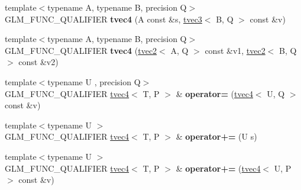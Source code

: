 \begin{DoxyCompactItemize}
\item 
{\footnotesize template$<$typename A, typename B, precision Q$>$ }\\G\+L\+M\+\_\+\+F\+U\+N\+C\+\_\+\+Q\+U\+A\+L\+I\+F\+I\+ER {\bfseries tvec4} (A const \&s, \hyperlink{structglm_1_1detail_1_1tvec3}{tvec3}$<$ B, Q $>$ const \&v)\hypertarget{structglm_1_1detail_1_1tvec4_aea55658ec0e7bb02b83a8cc618de125c}{}\label{structglm_1_1detail_1_1tvec4_aea55658ec0e7bb02b83a8cc618de125c}

\item 
{\footnotesize template$<$typename A, typename B, precision Q$>$ }\\G\+L\+M\+\_\+\+F\+U\+N\+C\+\_\+\+Q\+U\+A\+L\+I\+F\+I\+ER {\bfseries tvec4} (\hyperlink{structglm_1_1detail_1_1tvec2}{tvec2}$<$ A, Q $>$ const \&v1, \hyperlink{structglm_1_1detail_1_1tvec2}{tvec2}$<$ B, Q $>$ const \&v2)\hypertarget{structglm_1_1detail_1_1tvec4_a5ae1182faaf5b3409da227032738f74a}{}\label{structglm_1_1detail_1_1tvec4_a5ae1182faaf5b3409da227032738f74a}

\item 
{\footnotesize template$<$typename U , precision Q$>$ }\\G\+L\+M\+\_\+\+F\+U\+N\+C\+\_\+\+Q\+U\+A\+L\+I\+F\+I\+ER \hyperlink{structglm_1_1detail_1_1tvec4}{tvec4}$<$ T, P $>$ \& {\bfseries operator=} (\hyperlink{structglm_1_1detail_1_1tvec4}{tvec4}$<$ U, Q $>$ const \&v)\hypertarget{structglm_1_1detail_1_1tvec4_ab4a4d05d0c40397a25fdb2c2a5c4cd3f}{}\label{structglm_1_1detail_1_1tvec4_ab4a4d05d0c40397a25fdb2c2a5c4cd3f}

\item 
{\footnotesize template$<$typename U $>$ }\\G\+L\+M\+\_\+\+F\+U\+N\+C\+\_\+\+Q\+U\+A\+L\+I\+F\+I\+ER \hyperlink{structglm_1_1detail_1_1tvec4}{tvec4}$<$ T, P $>$ \& {\bfseries operator+=} (U s)\hypertarget{structglm_1_1detail_1_1tvec4_a6dcf29c92985638ec2b9b126efbe6f34}{}\label{structglm_1_1detail_1_1tvec4_a6dcf29c92985638ec2b9b126efbe6f34}

\item 
{\footnotesize template$<$typename U $>$ }\\G\+L\+M\+\_\+\+F\+U\+N\+C\+\_\+\+Q\+U\+A\+L\+I\+F\+I\+ER \hyperlink{structglm_1_1detail_1_1tvec4}{tvec4}$<$ T, P $>$ \& {\bfseries operator+=} (\hyperlink{structglm_1_1detail_1_1tvec4}{tvec4}$<$ U, P $>$ const \&v)\hypertarget{structglm_1_1detail_1_1tvec4_a90b24c30c735740c53e5549eb7c698b1}{}\label{structglm_1_1detail_1_1tvec4_a90b24c30c735740c53e5549eb7c698b1}


\end{DoxyCompactItemize}
